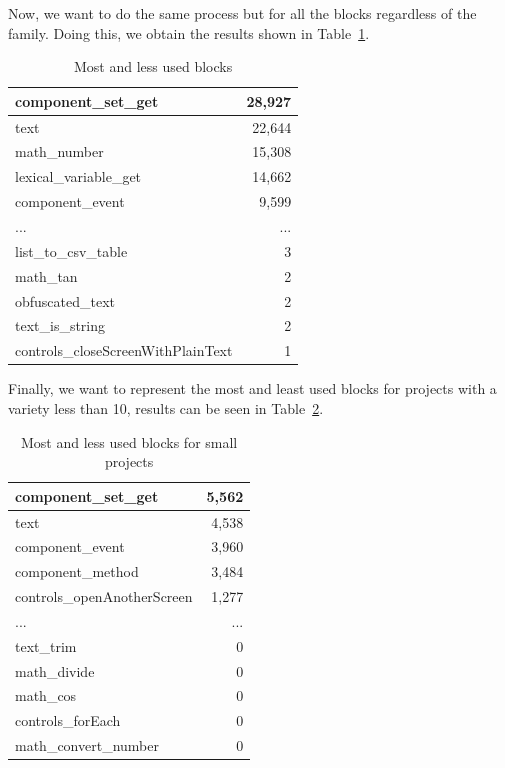 \documentclass[a4paper]{article}
\begin{document}
Now, we want to do the same process but for all the blocks regardless of the family. Doing this, we obtain the results shown in Table~\ref{tab:most-least}. 

\begin{table}[ht]
\begin{center}
\caption{Most and less used blocks}
\bigskip
\label{tab:most-least}
\begin{tabular}{|l|r|}
\hline
component\_set\_get & 28,927\\ \hline
text & 22,644\\ \hline
math\_number & 15,308\\ \hline
lexical\_variable\_get & 14,662\\ \hline
component\_event & 9,599\\ \hline
... & ... \\ \hline
list\_to\_csv\_table & 3\\ \hline
math\_tan & 2\\ \hline
obfuscated\_text & 2\\ \hline
text\_is\_string & 2\\ \hline
controls\_closeScreenWithPlainText & 1\\ \hline
\end{tabular}
\end{center}
\end{table}

Finally, we want to represent the most and least used blocks for projects with a variety less than 10, results can be seen in Table~\ref{tab:most-least-small}. 

\begin{table}[ht]
\begin{center}
\caption{Most and less used blocks for small projects}

\bigskip
\label{tab:most-least-small}
\begin{tabular}{|l|r|}
\hline
component\_set\_get & 5,562\\ \hline
text & 4,538\\ \hline
component\_event & 3,960\\ \hline
component\_method & 3,484\\ \hline
controls\_openAnotherScreen & 1,277\\ \hline
... & ... \\ \hline
text\_trim & 0\\ \hline
math\_divide & 0\\ \hline
math\_cos & 0\\ \hline
controls\_forEach & 0\\ \hline
math\_convert\_number & 0\\ \hline
\end{tabular}
\end{center}
\end{table}
\end{document}
